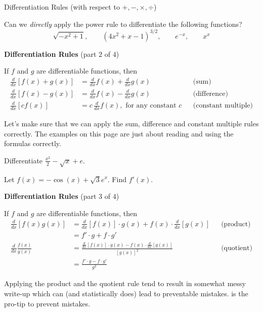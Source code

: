 \documentclass[../main.tex]{subfiles}
\begin{document}
\begin{lesson}{Differentiation Rules (with respect to \(+,-,\times,\div\))}
  \begin{example}
    Can we \emph{directly} apply the power rule to differentiate the following functions?
    \[
      \sqrt{-x^{2} + 1}, \qquad (4x^{2} + x - 1)^{3/2}, \qquad e^{-x}, \qquad x^{x}
    \]

  \end{example}

  \begin{mdframed}[style=simple]
    \textbf{Differentiation Rules} \hfill {\footnotesize (part \(2\) of \(4\))}

    If \(f\) and \(g\) are differentiable functions, then
    \begin{align*}
      \frac{d}{dx} [f(x) + g(x)] 
    &= \frac{d}{dx}f(x) + \frac{d}{dx}g(x)
    && \text{(sum)} \\[1em]
    \frac{d}{dx} [f(x) - g(x)] 
    &= \frac{d}{dx}f(x) - \frac{d}{dx}g(x)
    && \text{(difference)} \\[1em]
    \frac{d}{dx} [c f(x)] 
    &= c \, \frac{d}{dx} f(x), \text{ for any constant \(c\)}
    && \text{(constant multiple)}
    \end{align*}
  \end{mdframed}
  Let's make sure that we can apply the sum, difference and constant multiple rules correctly. The examples on this page are just about reading and using the formulas correctly. 

  \begin{example}
    Differentiate \(\frac{x^{2}}{2} - \sqrt{x} + e\).

  \end{example}

  \begin{example}
    Let \(f(x) = -\cos(x) + \sqrt{3} e^{x}\).  Find \(f'(x)\).

  \end{example}
  \clearpage

  \begin{mdframed}[style=simple]
    \textbf{Differentiation Rules} \hfill {\footnotesize (part \(3\) of \(4\))}

    If \(f\) and \(g\) are differentiable functions, then
    \begin{align*}
      \frac{d}{dx} [f(x)g(x)] 
    &= { \frac{d}{dx} [f(x)] \cdot g(x)+ f(x) \cdot \frac{d}{dx}[g(x)]}
    && \text{(product)} \\
    &= f' \cdot g + f \cdot g' \\[1em]
    \frac{d}{dx} \frac{f(x)}{g(x)}
    &= {\frac{\frac{d}{dx} [f(x)] \cdot g(x) - f(x) \cdot \frac{d}{dx}[g(x)] }{ [g(x)]^{2} }}
    && \text{(quotient)} \\
    &= \frac{f' \cdot g - f \cdot g'}{g^{2}}
    \end{align*}
  \end{mdframed}
  Applying the product and the quotient rule tend to result in somewhat messy write-up which can (and statistically does) lead to preventable mistakes.  is the pro-tip to prevent mistakes.


\end{lesson}
\end{document}
